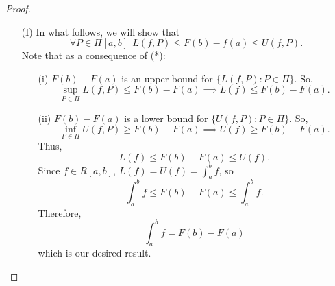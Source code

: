    \begin{proof}
    \begin{enumerate}
        \item[(I)] In what follows, we will show that 
            \[  \forall P \in \Pi[a,b] \ \ L(f,P) \leq F(b) - f(a) \leq U(f,P). \tag{*} \]
            Note that as a consequence of (*):
            \begin{enumerate}
                \item[(i)] \( F(b) - F(a) \) is an upper bound for \( \{ L(f,P) : P \in \Pi \}  \). So,
                    \[  \sup_{P \in \Pi} L(f,P) \leq F(b) - F(a) \implies L(f) \leq F(b) - F(a). \]
                \item[(ii)] \( F(b) - F(a)  \) is a lower bound for \( \{ U(f,P) : P \in \Pi \}  \). So, 
                    \[  \inf_{P \in \Pi} U(f,P) \geq F(b) - F(a) \implies U(f) \geq F(b) - F(a). \]
                    Thus, 
                    \[  L(f) \leq F(b) - F(a) \leq U(f). \]
                    Since \( f \in R[a,b] \), \( L(f) = U(f) = \displaystyle \int_{ a }^{ b } f   \), so 
                    \[  \int_{ a }^{ b }  f  \leq F(b) -F(a) \leq \int_{ a }^{ b }  f.   \]
                    Therefore, 
                    \[  \int_{ a }^{ b } f  = F(b) - F(a) \]
                   which is our desired result. 


\end{enumerate}
\end{enumerate}
\end{proof}
